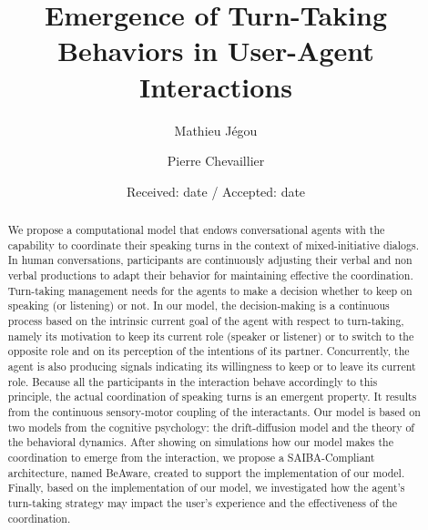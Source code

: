 \documentclass[twocolumn]{svjour3}
\begin{document}
\title{Emergence of Turn-Taking Behaviors in User-Agent Interactions}

\author{Mathieu J\'egou  \and
        Pierre Chevaillier
}


\date{Received: date / Accepted: date}

\maketitle 

\begin{abstract}
We propose a computational model that endows conversational agents with the capability to coordinate their speaking turns in the context of mixed-initiative dialogs.
In human conversations, participants are continuously adjusting their verbal and non verbal productions to adapt their behavior for maintaining effective the coordination. Turn-taking management needs for the agents to make a decision whether to keep on speaking (or listening) or not. In our model, the decision-making is a continuous process based on the intrinsic current goal of the agent with respect to turn-taking, namely its motivation to keep its current role (speaker or listener) or to switch to the opposite role and on its perception of the intentions of its partner. Concurrently, the agent is also producing signals indicating its willingness to keep or to leave its current role. Because all the participants in the interaction behave accordingly to this principle, the actual coordination of speaking turns is an emergent property. It results from the continuous sensory-motor coupling of the interactants. Our model is based on two models from the cognitive psychology: the drift-diffusion model and the theory of the behavioral dynamics. After showing on simulations how our model makes the coordination to emerge from the interaction, we propose a SAIBA-Compliant architecture, named BeAware, created to support the implementation of our model. Finally, based on the implementation of our model, we investigated how the agent's turn-taking strategy may impact the user's experience and the effectiveness of the coordination.

 
\end{abstract}


















\end{document}
